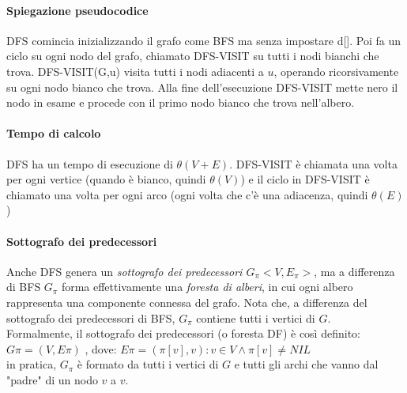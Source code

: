\paragraph{Spiegazione pseudocodice}
DFS comincia inizializzando il grafo come BFS ma senza impostare d[].
Poi fa un ciclo su ogni nodo del grafo, chiamato DFS-VISIT su tutti i nodi bianchi che trova.
DFS-VISIT(G,u) visita tutti i nodi adiacenti a $u$, operando ricorsivamente su ogni nodo bianco che trova.
Alla fine dell'esecuzione DFS-VISIT mette nero il nodo in esame e procede con il primo nodo bianco che trova nell'albero.
\paragraph*{Tempo di calcolo}
DFS ha un tempo di esecuzione di $\theta(V+E)$.
DFS-VISIT è chiamata una volta per ogni vertice (quando è bianco, quindi $\theta(V)$)
e il ciclo in DFS-VISIT è chiamato una volta per ogni arco (ogni volta che c'è una adiacenza, quindi $\theta(E)$)

\paragraph{Sottografo dei predecessori}
Anche DFS genera un \emph{sottografo dei predecessori $G_\pi<V,E_\pi>$}, ma a differenza di BFS
$G_\pi$ forma effettivamente una \emph{foresta di alberi}, in cui ogni albero rappresenta una componente connessa del grafo.
Nota che, a differenza del sottografo dei predecessori di BFS, $G_\pi$ contiene tutti i vertici di $G$.
\\Formalmente, il sottografo dei predecessori (o foresta DF) è così definito:
$G\pi = (V, E\pi )$ , dove:
$E\pi = {(\pi[v], v) : v \in V \land \pi[v] \neq NIL}$
\\in pratica, $G_\pi$ è formato da tutti i vertici di $G$ e tutti gli archi che vanno dal "padre" di un nodo $v$ a $v$.


